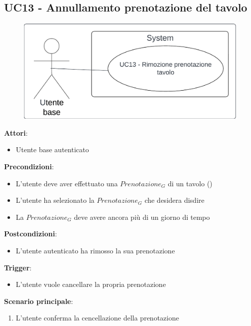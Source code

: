 \subsection{UC13 - Annullamento prenotazione del tavolo} \label{usecase:13}
\begin{figure}[H]
\centering
\includegraphics[width=0.75\linewidth]{ucd/ucd13.png}
\end{figure}
\textbf{Attori}:
\begin{itemize}
    \item Utente base autenticato
\end{itemize}
\textbf{Precondizioni}:
\begin{itemize}
    \item L'utente deve aver effettuato una $\textit{Prenotazione}_G$ di un tavolo ()
    \item L'utente ha selezionato la $\textit{Prenotazione}_G$ che desidera disdire
    \item La $\textit{Prenotazione}_G$ deve avere ancora più di un giorno di tempo
\end{itemize}
\textbf{Postcondizioni}:
\begin{itemize}
    \item L'utente autenticato ha rimosso la sua prenotazione
\end{itemize}
\textbf{Trigger}:
\begin{itemize}
    \item L'utente vuole cancellare la propria prenotazione
\end{itemize}
\textbf{Scenario principale}:
\begin{enumerate}
    \item L'utente conferma la cencellazione della prenotazione
\end{enumerate}
\newpage